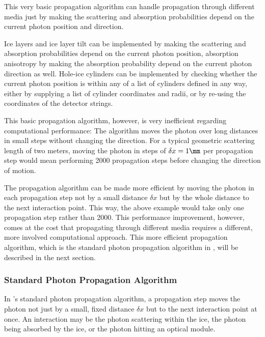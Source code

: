 This very basic propagation algorithm can handle propagation through different media just by making the scattering and absorption probabilities depend on the current photon position and direction.

Ice layers and ice layer tilt can be implemented by making the scattering and absorption probabilities depend on the current photon position, absorption anisotropy by making the absorption probability depend on the current photon direction as well. Hole-ice cylinders can be implemented by checking whether the current photon position is within any of a list of cylinders defined in any way, either by supplying a list of cylinder coordinates and radii, or by re-using the coordinates of the detector strings.

This basic propagation algorithm, however, is very inefficient regarding computational performance: The algorithm moves the photon over long distances in small steps without changing the direction. For a typical geometric scattering length of two meters, moving the photon in steps of $\delta x = 1\mm$ per propagation step would mean performing 2000 propagation steps before changing the direction of motion.

The propagation algorithm can be made more efficient by moving the photon in each propagation step not by a small distance $\delta x$ but by the whole distance to the next interaction point. This way, the above example would take only one propagation step rather than 2000. This performance improvement, however, comes at the cost that propagating through different media requires a different, more involved computational approach. This more efficient propagation algorithm, which is the standard photon propagation algorithm in \icecube, will be described in the next section.


\subsubsection{Standard Photon Propagation Algorithm}
\label{sec:standardphotonpropagationalgorithm}
\label{sec:standard_photon_propagation_algorithm}
\label{sec:standard_clsim}

In \icecube's standard photon propagation algorithm, a propagation step moves the photon not just by a small, fixed distance $\delta x$ but to the next interaction point at once. An interaction may be the photon scattering within the ice, the photon being absorbed by the ice, or the photon hitting an optical module. \cite{clsimsource, ppcpaper}

